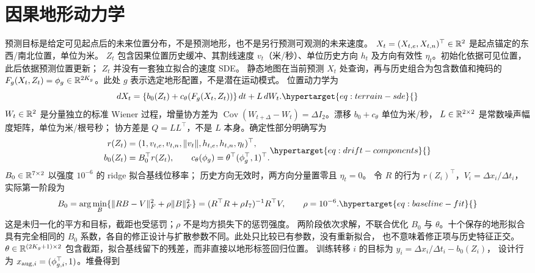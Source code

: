 \section{因果地形动力学}
预测目标是给定可见起点后的未来位置分布，不是预测地形，也不是另行预测可观测的未来速度。
\(X_t=(X_{t,e},X_{t,n})^\top\in\mathbb{R}^2\) 是起点锚定的东西/南北位置，单位为米。
\(Z_t\) 包含因果位置历史缓冲、其割线速度 \(v_t\)（米/秒）、单位历史方向 \(h_t\)
及方向有效性 \(\eta_t\)。初始化依据可见位置，此后依据预测位置更新；
\(Z_t\) 并没有一套独立拟合的速度 SDE。
静态地图在当前预测 \(X_t\) 处查询，再与历史组合为包含数值和掩码的
\(F_g(X_t,Z_t)=\phi_g\in\mathbb{R}^{2K_g}\)。此处 \(g\) 表示选定地形配置，不是潜在运动模式。
位置动力学为
\begin{equation}
dX_t=\{b_0(Z_t)+c_\theta(F_g(X_t,Z_t))\}\,dt+L\,dW_t.
\label{eq:terrain-sde}\hypertarget{eq:terrain-sde}{}
\end{equation}
\(W_t\in\mathbb{R}^2\) 是分量独立的标准 Wiener 过程，增量协方差为
\(\operatorname{Cov}(W_{t+\Delta}-W_t)=\Delta I_2\)。漂移 \(b_0+c_\theta\) 单位为米/秒，
\(L\in\mathbb{R}^{2\times2}\) 是常数噪声幅度矩阵，单位为米/根号秒；
协方差是 \(Q=LL^\top\)，不是 \(L\) 本身。确定性部分明确写为
\begin{equation}
\begin{aligned}
r(Z_t)&=(1,v_{t,e},v_{t,n},\|v_t\|,h_{t,e},h_{t,n},\eta_t)^\top,\\
b_0(Z_t)&=B_0^\top r(Z_t),\qquad
c_\theta(\phi_g)=\theta^\top(\phi_g^\top,1)^\top.
\end{aligned}
\label{eq:drift-components}\hypertarget{eq:drift-components}{}
\end{equation}
\(B_0\in\mathbb{R}^{7\times2}\) 以强度 \(10^{-6}\) 的 ridge 拟合基线位移率；
历史方向无效时，两方向分量置零且 \(\eta_t=0\)。
令 \(R\) 的行为 \(r(Z_i)^\top\)，\(V_i=\Delta x_i/\Delta t_i\)，实际第一阶段为
\begin{equation}
B_0=\arg\min_B\{\|RB-V\|_F^2+\rho\|B\|_F^2\}
 =(R^\top R+\rho I_7)^{-1}R^\top V,\qquad\rho=10^{-6}.
\label{eq:baseline-fit}\hypertarget{eq:baseline-fit}{}
\end{equation}
这是未归一化的平方和目标，截距也受惩罚；\(\rho\) 不是均方损失下的惩罚强度。
两阶段依次求解，不联合优化 \(B_0\) 与 \(\theta\)。十个保存的地形拟合具有完全相同的
\(B_0\) 系数，各自的修正设计与扩散参数不同。此处只比较已有参数，没有重新拟合，
也不意味着修正项与历史特征正交。
\(\theta\in\mathbb{R}^{(2K_g+1)\times2}\) 包含截距，拟合基线留下的残差，而非直接以地形标签回归位置。
训练转移 \(i\) 的目标为 \(y_i=\Delta x_i/\Delta t_i-b_0(Z_i)\)，
设计行为 \(x_{{\rm aug},i}=(\phi_{g,i}^\top,1)\)。堆叠得到

